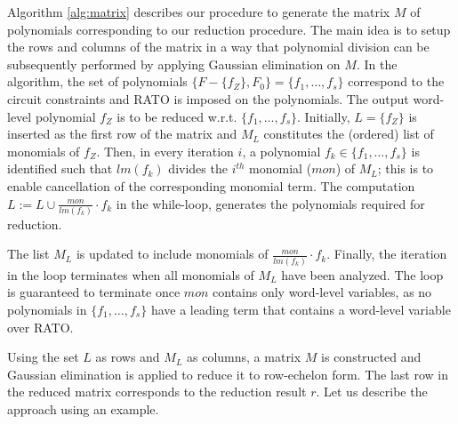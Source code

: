 Algorithm \ref{alg:matrix} describes our procedure to generate the 
matrix $M$ of polynomials corresponding to our reduction procedure. 
The main idea is to setup the rows and columns of the matrix in a 
way that polynomial division can be subsequently performed by 
applying Gaussian elimination on $M$. 
In the algorithm, the set of polynomials 
$\{F-\{f_Z\},F_0\} = \{f_1, \dots, f_s\}$ 
correspond to the circuit constraints and RATO 
is imposed on the polynomials. 
The output word-level polynomial $f_Z$ is to be reduced
w.r.t. $\{f_1, \dots, f_s\}$. Initially, $L = \{f_Z\}$ is inserted as
the first row of the matrix and $M_L$ constitutes the (ordered) list
of monomials of $f_Z$. Then, in every iteration $i$, a polynomial $f_k \in
\{f_1, \dots, f_s\}$ is identified such that $lm(f_k)$ divides the $i^{th}$ monomial
($mon$) of $M_L$; this is to enable cancellation of the corresponding
monomial term. The computation $L:=L \cup \frac{mon}{lm(f_{k})}\cdot
f_{k}$ in the while-loop, generates the polynomials required for
reduction.


The list $M_L$ is updated to include monomials of
$\frac{mon}{lm(f_{k})}\cdot f_{k}$. Finally, the iteration in the
loop terminates when all monomials of $M_L$ have been analyzed.
The loop is guaranteed to terminate once $mon$ contains only
word-level variables, as no polynomials in $\{f_1,\dots,f_s\}$ have a leading
term that contains a word-level variable over RATO.

Using the set $L$ as rows and $M_L$ as columns, a matrix $M$ is
constructed and Gaussian elimination is applied to reduce it to
row-echelon form. The last row in the reduced matrix 
corresponds to the reduction result $r$. 
Let us describe the approach using an example.


